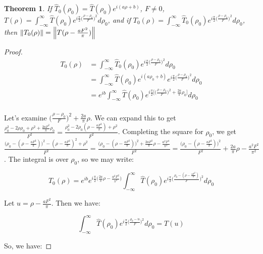 \documentclass{article}
\theoremstyle{mystyle}
\newtheorem{theorem}{Theorem}[section]
\begin{document}
\begin{theorem}
If $\hat{T}_0(\rho_0) = \hat{T}(\rho_0)e^{i(a\rho+b)}$, $F\ne 0$, $T(\rho) = \int_{-\infty}^{\infty}\hat{T}(\rho_0)e^{i\frac{\pi}{2}\big(\frac{\rho-\rho_0}{F}\big)^2} d\rho_0$, and if $T_{0}(\rho) = \int_{-\infty}^{\infty}\hat{T}_{0}(\rho_0)e^{i\frac{\pi}{2}\big(\frac{\rho-\rho_0}{F}\big)^2} d\rho_0$, then $\norm{T_{0}(\rho)} = \norm{T(\rho - \frac{aF^2}{\pi})}$
\end{theorem}
\begin{proof}
\begin{align}
\nonumber T_0(\rho) &= \int_{-\infty}^{\infty} \hat{T}_{0}(\rho_0)e^{i\frac{\pi}{2}\big(\frac{\rho-\rho_0}{F}\big)^2}d\rho_0\\
\nonumber	&=\int_{-\infty}^{\infty} \hat{T}(\rho_0)e^{i(a\rho_0+b)}e^{i\frac{\pi}{2}\big(\frac{\rho - \rho_0}{F}\big)^2}d\rho_0 \\
	&= e^{ib}\int_{-\infty}^{\infty}\hat{T}(\rho_0)e^{i\frac{\pi}{2}\bigg[\big(\frac{\rho-\rho_0}{F}\big)^2 + \frac{2a}{\pi}\rho_0\bigg]}d\rho_0\\
\end{align}

Let's examine $\big(\frac{\rho-\rho_0}{F}\big)^2 + \frac{2a}{\pi}\rho$. We can expand this to get $\frac{\rho_0^2 - 2\rho\rho_0 + \rho^2 + \frac{2aF^2}{\pi}\rho_0}{F^2} = \frac{\rho_0^2 - 2\rho_0(\rho - \frac{aF^2}{\pi}) + \rho^2}{F^2}$. Completing the square for $\rho_0$, we get $\frac{\big(\rho_0 - (\rho - \frac{aF^2}{\pi})\big)^2 - (\rho - \frac{aF^2}{\pi})^2 + \rho^2}{F^2} = \frac{\big(\rho_0 - (\rho-\frac{aF^2}{\pi})\big)^2 +\frac{2aF^2}{\pi}\rho - \frac{a^2F^4}{\pi^2}}{F^2} = \frac{\big(\rho_0 - (\rho-\frac{aF^2}{\pi})\big)^2}{F^2} + \frac{2a}{\pi}\rho - \frac{a^2F^2}{\pi^2}$. The integral is over $\rho_0$, so we may write:

\begin{equation}
T_0(\rho) = e^{ib}e^{i\frac{\pi}{2}\big(\frac{2a}{\pi}\rho - \frac{a^2F^2}{\pi^2}\big)}\int_{-\infty}^{\infty} \hat{T}(\rho_0)e^{i\frac{\pi}{2}\big(\frac{\rho_0 - (\rho - \frac{aF^2}{\pi})}{F}\big)^2}d\rho_0
\end{equation}

Let $u = \rho - \frac{aF^2}{\pi}$. Then we have:

\begin{equation}
\int_{-\infty}^{\infty} \hat{T}(\rho_0)e^{i\frac{\pi}{2}\big(\frac{\rho_0 - u}{F}\big)^2}d\rho_0 = T(u)
\end{equation}

So, we have:


\end{proof}
\end{document}
